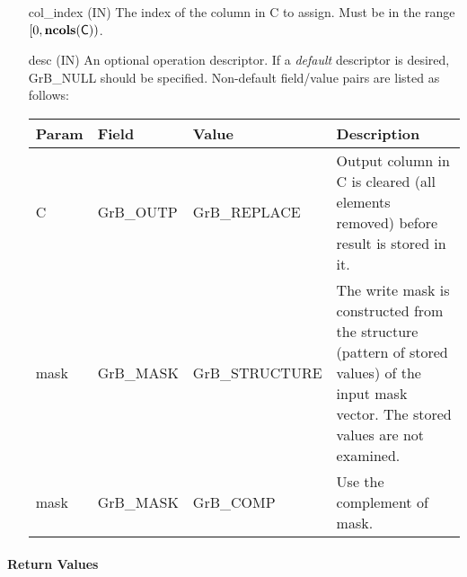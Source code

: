 \begin{itemize}[leftmargin=1.1in]
    \item[{\sf col\_index}]  ({\sf IN}) The index of the column in {\sf C} to 
    assign. Must be in the range $[0, \bold{ncols}({\sf C}))$.

    \item[{\sf desc}] ({\sf IN}) An optional operation descriptor. If
    a \emph{default} descriptor is desired, {\sf GrB\_NULL} should be
    specified. Non-default field/value pairs are listed as follows:  \\

    \hspace*{-2em}\begin{tabular}{lllp{2.7in}}
        Param & Field  & Value & Description \\
        \hline
        {\sf C}    & {\sf GrB\_OUTP} & {\sf GrB\_REPLACE} &  Output column in 
        {\sf C} is cleared (all elements removed) before result is stored in it.\\

        {\sf mask} & {\sf GrB\_MASK} & {\sf GrB\_STRUCTURE}   & The write mask is
        constructed from the structure (pattern of stored values) of the input
        {\sf mask} vector. The stored values are not examined.\\

        {\sf mask} & {\sf GrB\_MASK} & {\sf GrB\_COMP}   & Use the 
        complement of {\sf mask}. \\
    \end{tabular}
\end{itemize}

\paragraph{Return Values}

